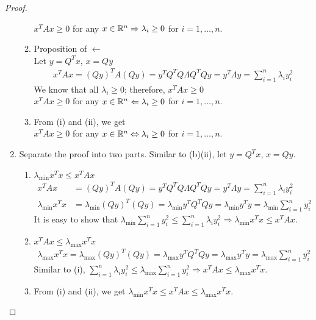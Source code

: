 \documentclass[12pt]{extarticle}
\theoremstyle{definition}
\begin{document}
\begin{proof}
\begin{enumerate}[label=(\alph*)]
\begin{enumerate}[label=(\roman*)]
          $x^TAx\ge 0$ for any $x\in\mathbb{R}^n\Rightarrow\lambda_i\ge 0$ for $i=1,\dots,n$.
        \item Proposition of $\leftarrow$\\
          Let $y=Q^Tx$, \ie $x=Qy$
          \begin{align*}
            x^TAx=(Qy)^TA(Qy)=y^TQ^TQ\Lambda Q^TQy=y^T\Lambda y=\sum_{i=1}^n\lambda_iy_i^2
          \end{align*}
          We know that all $\lambda_i\ge 0$; therefore, $x^TAx\ge 0$\\
          $x^TAx\ge 0$ for any $x\in\mathbb{R}^n\Leftarrow\lambda_i\ge 0$ for $i=1,\dots,n$.
        \item From (i) and (ii), we get\\
        $x^TAx\ge 0$ for any $x\in\mathbb{R}^n\Leftrightarrow\lambda_i\ge 0$ for $i=1,\dots,n$.
      \end{enumerate}
\newpage
    \item Separate the proof into two parts. Similar to (b)(ii), let $y=Q^Tx$, \ie $x=Qy$.
      \begin{enumerate}[label=(\roman*)]
        \item $\lambda_{\min}x^Tx\le x^TAx$
          \begin{align*}
            x^TAx &= (Qy)^TA(Qy)=y^TQ^TQ\Lambda Q^TQy=y^T\Lambda y=\sum_{i=1}^n\lambda_iy_i^2\\
            \lambda_{\min}x^Tx &=\lambda_{\min}(Qy)^T(Qy)=\lambda_{\min}y^TQ^TQy=\lambda_{\min}y^Ty=\lambda_{\min}\sum_{i=1}^ny_i^2
          \end{align*}
          It is easy to show that $\lambda_{\min}\sum_{i=1}^ny_i^2\le\sum_{i=1}^n\lambda_iy_i^2\Rightarrow\lambda_{\min}x^Tx\le x^TAx$.
        \item $x^TAx\le \lambda_{\max}x^Tx$
          \begin{align*}
            \lambda_{\max}x^Tx =\lambda_{\max}(Qy)^T(Qy)=\lambda_{\max}y^TQ^TQy=\lambda_{\max}y^Ty=\lambda_{\max}\sum_{i=1}^ny_i^2
          \end{align*}
          Similar to (i), $\sum_{i=1}^n\lambda_iy_i^2\le\lambda_{\max}\sum_{i=1}^ny_i^2\Rightarrow x^TAx\le \lambda_{\max}x^Tx$.
        \item From (i) and (ii), we get $\lambda_{\min}x^Tx\le x^TAx\le \lambda_{\max}x^Tx$.\qedhere      
      \end{enumerate}
  \end{enumerate}
\end{proof}
\end{document}
